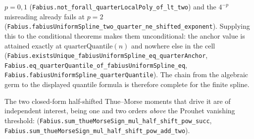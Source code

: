 \documentclass[11pt,oneside]{article}
\numberwithin{equation}{section}
\theoremstyle{definition}
\theoremstyle{remark}
\begin{document}
\begin{obligation}
\(p=0,1\) (\nolinkurl{Fabius.not_forall_quarterLocalPoly_of_lt_two}) and the \(4^{-p}\)
misreading already fails at \(p=2\)
(\nolinkurl{Fabius.fabiusUniformSpline_two_quarter_ne_shifted_exponent}).  Supplying this to
the conditional theorems makes them unconditional: the anchor value is attained exactly at
\(\mathrm{quarterQuantile}(n)\) and nowhere else in the cell
(\nolinkurl{Fabius.existsUnique_fabiusUniformSpline_eq_quarterAnchor},
\nolinkurl{Fabius.eq_quarterQuantile_of_fabiusUniformSpline_eq},
\nolinkurl{Fabius.fabiusUniformSpline_quarterQuantile}).  The chain from the algebraic germ
to the displayed quantile formula is therefore complete for the finite spline.

The two closed-form half-shifted Thue--Morse moments that drive it are of independent
interest, being one and two orders \emph{above} the Prouhet vanishing threshold:
(\nolinkurl{Fabius.sum_thueMorseSign_mul_half_shift_pow_succ}, \nolinkurl{Fabius.sum_thueMorseSign_mul_half_shift_pow_add_two}).
\end{obligation}
\end{document}
